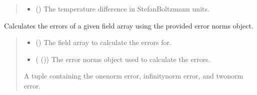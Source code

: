 \documentclass[a4paper,11pt,english,openany]{sphinxmanual}
\begin{document}
\begin{fulllineitems}
\begin{fulllineitems}
\begin{quote}
\begin{description}
\begin{itemize}
\item {} 
\sphinxAtStartPar
{} () \textendash{} The temperature difference in Stefan\sphinxhyphen{}Boltzmann units.

\end{itemize}

\end{description}\end{quote}

\end{fulllineitems}


\begin{fulllineitems}
\label{\detokenize{api/spyice.postprocess.analysis:src.spyice.postprocess.analysis.Analysis.calculate_errors}}
\pysigstartsignatures
\pysiglinewithargsret
{}
{\sphinxparamcomma {}}
{}
\pysigstopsignatures
\sphinxAtStartPar
Calculates the errors of a given field array using the provided error norms object.
\begin{quote}\begin{description}
\begin{itemize}
\item {} 
\sphinxAtStartPar
{} () \textendash{} The field array to calculate the errors for.

\item {} 
\sphinxAtStartPar
{} ({\hyperref[\detokenize{api/spyice.utils.error_norms:src.spyice.utils.error_norms.ErrorNorms}]{}} ()) \textendash{} The error norms object used to calculate the errors.

\end{itemize}

\sphinxAtStartPar
A tuple containing the one\sphinxhyphen{}norm error, infinity\sphinxhyphen{}norm error, and two\sphinxhyphen{}norm error.


\end{description}
\end{quote}
\end{fulllineitems}
\end{fulllineitems}
\end{document}
